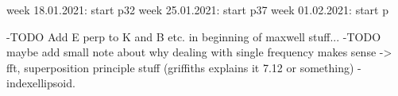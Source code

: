week 18.01.2021: start p32
week 25.01.2021: start p37
week 01.02.2021: start p

-TODO Add E perp to K and B etc. in beginning of maxwell stuff...
-TODO maybe add small note about why dealing with single frequency makes sense -> fft, superposition principle stuff (griffiths explains it 7.12 or something)
-indexellipsoid.